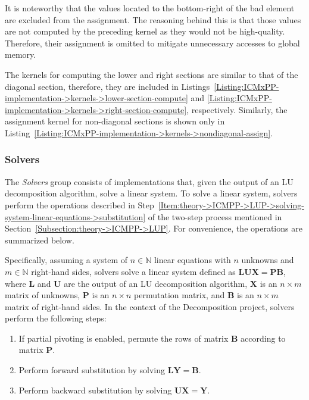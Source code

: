 It is noteworthy that the values located to the bottom-right of the bad element are excluded from the assignment. The reasoning behind this is that those values are not computed by the preceding kernel as they would not be high-quality. Therefore, their assignment is omitted to mitigate unnecessary accesses to global memory.

The kernels for computing the lower and right sections are similar to that of the diagonal section, therefore, they are included in Listings~\ref{Listing:ICMxPP-implementation->kernels->lower-section-compute} and \ref{Listing:ICMxPP-implementation->kernels->right-section-compute}, respectively. Similarly, the assignment kernel for non-diagonal sections is shown only in Listing~\ref{Listing:ICMxPP-implementation->kernels->nondiagonal-assign}.

\subsubsection{Solvers}\label{Subsection:implementation->decomposition-project->implemented-solutions->solvers}
The \textit{Solvers} group consists of implementations that, given the output of an LU decomposition algorithm, solve a linear system. To solve a linear system, solvers perform the operations described in Step~\ref{Item:theory->ICMPP->LUP->solving-system-linear-equations->substitution} of the two-step process mentioned in Section~\ref{Subsection:theory->ICMPP->LUP}. For convenience, the operations are summarized below.

Specifically, assuming a system of $n \in \mathbb{N}$ linear equations with $n$ unknowns and $m \in \mathbb{N}$ right-hand sides, solvers solve a linear system defined as $\mathbf{LUX} = \mathbf{PB}$, where $\mathbf{L}$ and $\mathbf{U}$ are the output of an LU decomposition algorithm, $\mathbf{X}$ is an $n\times m$ matrix of unknowns, $\mathbf{P}$ is an $n\times n$ permutation matrix, and $\mathbf{B}$ is an $n\times m$ matrix of right-hand sides. In the context of the Decomposition project, solvers perform the following steps:

\begin{enumerate}
	\item If partial pivoting is enabled, permute the rows of matrix $\mathbf{B}$ according to matrix $\mathbf{P}$.
	\item \label{Item:implementation->decomposition-project->implemented-solutions->solvers->forward-substitution}
		Perform forward substitution by solving $\mathbf{LY} = \mathbf{B}$.
	\item \label{Item:implementation->decomposition-project->implemented-solutions->solvers->backward-substitution}
		Perform backward substitution by solving $\mathbf{UX} = \mathbf{Y}$.
\end{enumerate}

